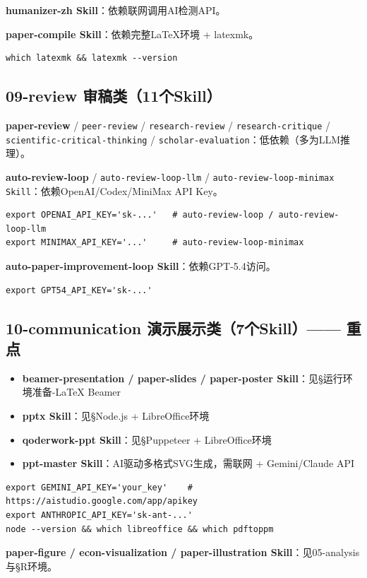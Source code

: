 \textbf{humanizer-zh Skill}：依赖联网调用AI检测API。

\textbf{paper-compile Skill}：依赖完整LaTeX环境 + latexmk。
\begin{lstlisting}[style=shell]
which latexmk && latexmk --version
\end{lstlisting}

\subsection{09-review 审稿类（11个Skill）}
\textbf{paper-review} / \texttt{peer-review} / \texttt{research-review} / \texttt{research-critique} / \texttt{scientific-critical-thinking} / \texttt{scholar-evaluation}：低依赖（多为LLM推理）。

\textbf{auto-review-loop} / \texttt{auto-review-loop-llm} / \texttt{auto-review-loop-minimax Skill}：依赖OpenAI/Codex/MiniMax API Key。
\begin{lstlisting}[style=shell]
export OPENAI_API_KEY='sk-...'   # auto-review-loop / auto-review-loop-llm
export MINIMAX_API_KEY='...'     # auto-review-loop-minimax
\end{lstlisting}
\textbf{auto-paper-improvement-loop Skill}：依赖GPT-5.4访问。
\begin{lstlisting}[style=shell]
export GPT54_API_KEY='sk-...'
\end{lstlisting}

\subsection{10-communication 演示展示类（7个Skill）—— 重点}
\begin{itemize}[leftmargin=1em]
  \item \textbf{beamer-presentation / paper-slides / paper-poster Skill}：见§运行环境准备-LaTeX Beamer
  \item \textbf{pptx Skill}：见§Node.js + LibreOffice环境
  \item \textbf{qoderwork-ppt Skill}：见§Puppeteer + LibreOffice环境
  \item \textbf{ppt-master Skill}：AI驱动多格式SVG生成，需联网 + Gemini/Claude API
\end{itemize}
\begin{lstlisting}[style=shell]
export GEMINI_API_KEY='your_key'    # https://aistudio.google.com/app/apikey
export ANTHROPIC_API_KEY='sk-ant-...'
node --version && which libreoffice && which pdftoppm
\end{lstlisting}
\textbf{paper-figure / econ-visualization / paper-illustration Skill}：见05-analysis与§R环境。

